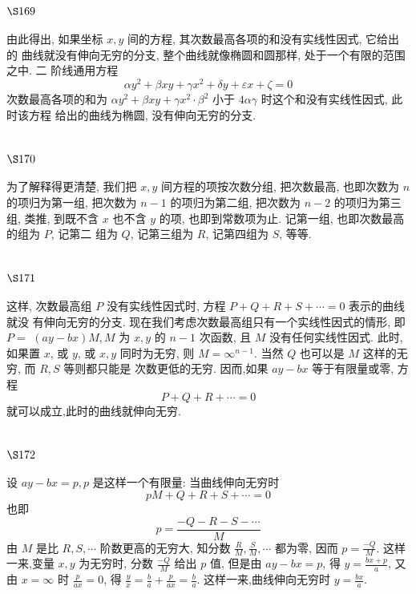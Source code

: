 \section{$\S 169$}

由此得出, 如果坐标 $x, y$ 间的方程, 其次数最高各项的和没有实线性因式, 它给出的 曲线就没有伸向无穷的分支, 整个曲线就像椭圆和圆那样, 处于一个有限的范围之中. 二 阶线通用方程
\[
\alpha y^{2}+\beta x y+\gamma x^{2}+\delta y+\varepsilon x+\zeta=0
\]
次数最高各项的和为 $\alpha y^{2}+\beta x y+\gamma x^{2} \cdot \beta^{2}$ 小于 $4 \alpha \gamma$ 时这个和没有实线性因式, 此时该方程 给出的曲线为椭圆, 没有伸向无穷的分支.

\section{$\S 170$}

为了解释得更清楚, 我们把 $x, y$ 间方程的项按次数分组, 把次数最高, 也即次数为 $n$ 的项归为第一组, 把次数为 $n-1$ 的项归为第二组, 把次数为 $n-2$ 的项归为第三组, 类推, 到既不含 $x$ 也不含 $y$ 的项, 也即到常数项为止. 记第一组, 也即次数最高的组为 $P$, 记第二 组为 $Q$, 记第三组为 $R$, 记第四组为 $S$, 等等.

\section{$\S 171$}

这样, 次数最高组 $P$ 没有实线性因式时, 方程 $P+Q+R+S+\cdots=0$ 表示的曲线就没 有伸向无穷的分支. 现在我们考虑次数最高组只有一个实线性因式的情形, 即 $P=$ $(a y-b x) M, M$ 为 $x, y$ 的 $n-1$ 次函数, 且 $M$ 没有任何实线性因式. 此时, 如果置 $x$, 或 $y$, 或 $x, y$ 同时为无穷, 则 $M=\infty^{n-1}$. 当然 $Q$ 也可以是 $M$ 这样的无穷, 而 $R, S$ 等则都只能是 次数更低的无穷. 因而,如果 $a y-b x$ 等于有限量或零, 方程
\[
P+Q+R+\cdots=0
\]
就可以成立,此时的曲线就伸向无穷.

\section{$\S 172$}

设 $a y-b x=p, p$ 是这样一个有限量: 当曲线伸向无穷时
\[
p M+Q+R+S+\cdots=0
\]
也即
\[
p=\frac{-Q-R-S-\cdots}{M}
\]
由 $M$ 是比 $R, S, \cdots$ 阶数更高的无穷大, 知分数 $\frac{R}{M}, \frac{S}{M}, \cdots$ 都为零, 因而 $p=\frac{-Q}{M}$. 这样一来,变量 $x, y$ 为无穷时, 分数 $\frac{-Q}{M}$ 给出 $p$ 值, 但是由 $a y-b x=p$, 得 $y=\frac{b x+p}{a}$, 又由 $x=\infty$ 时 $\frac{p}{a x}=0$, 得 $\frac{y}{x}=\frac{b}{a}+\frac{p}{a x}=\frac{b}{a}$. 这样一来,曲线伸向无穷时 $y=\frac{b x}{a}$.


